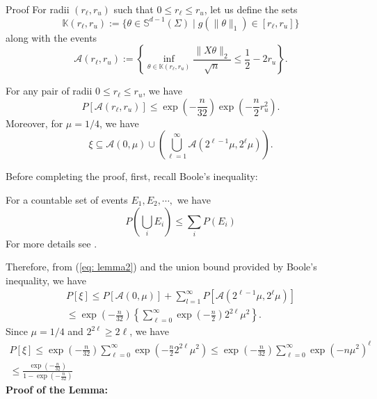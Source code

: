 \documentclass[10pt,handout,english]{beamer}
\newcommand{\K}{\mathbb{K}}
\newcommand{\A}{\mathcal{A}}
\renewcommand{\S}{\mathbb{S}}
\begin{document}
\begin{frame}[allowframebreaks]{Proof}
For radii $(r_{\ell},r_u)$ such that $0\leq r_{\ell}\leq r_u$, let us define the sets
\begin{equation}\label{eq: 7.56a}
\K(r_{\ell},r_u):=\{\theta\in\S^{d-1}(\Sigma)\mid g(\lVert\theta\rVert_1)\in[r_{\ell},r_u]\}
\end{equation}
along with the events
\begin{equation}\label{eq: 7.56b}
\A(r_{\ell},r_u):=\left\{\inf_{\theta\in\K(r_{\ell},r_u)}\frac{\lVert X\theta\rVert_2}{\sqrt{n}}\leq \frac{1}{2}-2r_u\right\}.
\end{equation}
\begin{lemma}
For any pair of radii $0\leq r_{\ell}\leq r_u$, we have
\begin{equation}\label{eq: lemma1}
P[\A(r_{\ell},r_u)]\leq \exp\left(-\frac{n}{32}\right)\exp\left(-\frac{n}{2}r_u^2\right).
\end{equation}
Moreover, for $\mu=1/4$, we have
\begin{equation}\label{eq: lemma2}
\xi\subseteq \A(0,\mu)\cup\left(\bigcup\limits_{\ell=1}^{\infty}\A(2^{\ell-1}\mu,2^\ell\mu)\right).
\end{equation}
\end{lemma}
Before completing the proof, first, recall Boole's inequality:
\begin{definition}
For a countable set of events $E_1,E_2,\cdots,$ we have
\[
P\left(\bigcup\limits_{i}E_i\right)\leq\sum\limits_{i}P(E_i)
\]
For more details see \citet{grimmett2020probability}.
\end{definition}


Therefore, from (\ref{eq: lemma2}) and the union bound provided by Boole's inequality, we have
\begin{align*}
P[\xi]\leq P[\A(0,\mu)]+\sum\limits_{l=1}^{\infty}P\left[\A(2^{\ell-1}\mu,2^{\ell}\mu)\right]\\
\leq \exp\left(-\frac{n}{32}\right)\left\{\sum\limits_{\ell=0}^{\infty}\exp\left(-\frac{n}{2}\right)2^{2\ell}\mu^2\right\}.
\end{align*}
Since $\mu=1/4$ and $2^{2\ell}\geq 2\ell$, we have
\begin{align*}
P[\xi]\leq\exp\left(-\frac{n}{32}\right)\sum\limits_{\ell=0}^{\infty}\exp\left(-\frac{n}{2}2^{2\ell}\mu^2\right)\leq\exp\left(-\frac{n}{32}\right) \sum\limits_{\ell=0}^{\infty}\exp\left(-n\mu^2\right)^{\ell}\\
\leq\frac{\exp\left(-\frac{n}{32}\right)}{1-\exp\left(-\frac{n}{32}\right)}
\end{align*}
\textbf{Proof of the Lemma:}



\end{frame}
\end{document}
